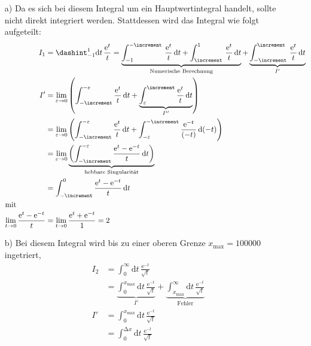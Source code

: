 \begin{itemize}[leftmargin=*]
\item[a)] Da es sich bei diesem Integral um ein Hauptwertintegral handelt, sollte nicht direkt integriert werden. Stattdessen wird das Integral wie folgt aufgeteilt:
          \begin{align*}
          I_1 &= \dashint_{-1}^{1} \text{d} t \,\frac{\text{e}^{t}}{t} = \underbrace{\int_{-1}^{-\increment} \, \frac{\text{e}^{t}}{t} \, \text{d} t + \int_{\increment}^{1} \, \frac{\text{e}^{t}}{t} \, \text{d} t}_{\text{Numerische Berechnung}} + \underbrace{\int_{-\increment}^{\increment} \, \frac{\text{e}^{t}}{t} \, \text{d} t}_{I'} \\
          I' &= \lim_{\varepsilon\to 0} \left(\int_{-\increment}^{-\varepsilon} \frac{\text{e}^{t}}{t}  \, \text{d} t +  \underbrace{\int_{\varepsilon}^{\increment} \frac{\text{e}^{t}}{t}  \, \text{d} t}_{I''}\right) \\
             &= \lim_{\varepsilon\to 0} \left(\int_{-\increment}^{-\varepsilon} \frac{\text{e}^{t}}{t}  \, \text{d} t + \int_{-\varepsilon}^{-\increment} \frac{\text{e}^{-t}}{(-t)}  \, \text{d} (-t)\right) \\
             &= \lim_{\varepsilon\to 0} \underbrace{\left(\int_{-\increment}^{-\varepsilon} \frac{\text{e}^{t}-\text{e}^{-t}}{t}  \, \text{d} t \right)}_{\text{hebbare Singularität}} \\
             &= \int_{-\increment}^{0} \frac{\text{e}^{t}-\text{e}^{-t}}{t}  \, \text{d} t \\
          \intertext{mit}
          \lim_{t \to 0} \frac{\text{e}^{t}-\text{e}^{-t}}{t} &= \lim_{t \to 0} \frac{\text{e}^{t}+\text{e}^{-t}}{1} = 2
          \end{align*}
\item[b)] Bei diesem Integral wird bis zu einer oberen Grenze $x_\text{max} = 100000$ ingetriert,
          \begin{align*}
          I_2 &= \int_0^{\infty} \text{d} t \, \frac{\text{e}^{-t}}{\sqrt{t}} \\
              &=  \underbrace{\int_0^{x_\text{max}} \text{d} t \, \frac{\text{e}^{-t}}{\sqrt{t}}}_{I'} +  \underbrace{\int_{x_\text{max}}^{\infty} \text{d} t \, \frac{\text{e}^{-t}}{\sqrt{t}}}_{\text{Fehler}} \\
          I' &= \int_0^{x_\text{max}} \text{d} t \, \frac{\text{e}^{-t}}{\sqrt{t}} \\
             &= \int_0^{\increment x} \text{d} t \, \frac{\text{e}^{-t}}{\sqrt{t}}
          \end{align*}

\end{itemize}
